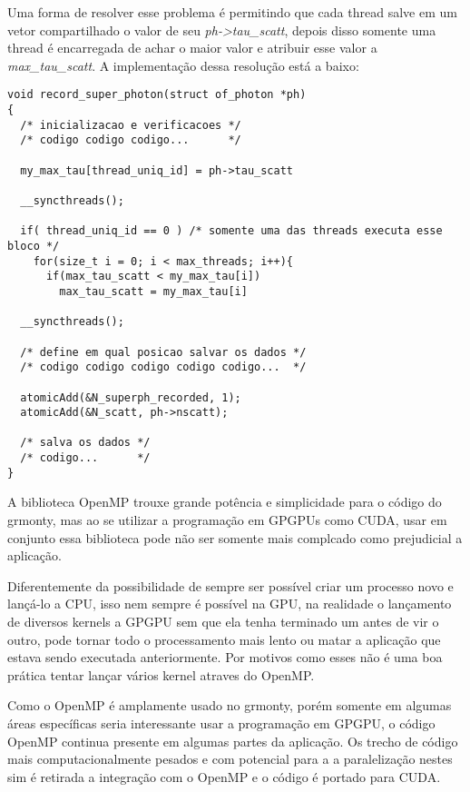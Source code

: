     Uma forma de resolver esse problema é permitindo que cada thread salve em um vetor compartilhado o valor de seu \textit{ph->tau\_scatt}, depois disso somente uma thread é encarregada de achar o maior valor e atribuir esse valor a \textit{max\_tau\_scatt}. A implementação dessa resolução está a baixo:

    \begin{lstlisting}
void record_super_photon(struct of_photon *ph)
{
  /* inicializacao e verificacoes */
  /* codigo codigo codigo...      */

  my_max_tau[thread_uniq_id] = ph->tau_scatt

  __syncthreads();

  if( thread_uniq_id == 0 ) /* somente uma das threads executa esse bloco */
    for(size_t i = 0; i < max_threads; i++){
      if(max_tau_scatt < my_max_tau[i])
        max_tau_scatt = my_max_tau[i]

  __syncthreads();

  /* define em qual posicao salvar os dados */
  /* codigo codigo codigo codigo codigo...  */

  atomicAdd(&N_superph_recorded, 1);
  atomicAdd(&N_scatt, ph->nscatt);

  /* salva os dados */
  /* codigo...      */
}
    \end{lstlisting}

    A biblioteca OpenMP trouxe grande potência e simplicidade para o código do grmonty, mas ao se utilizar a programação em GPGPUs como CUDA, usar em conjunto essa biblioteca pode não ser somente mais complcado como prejudicial a aplicação.

    Diferentemente da possibilidade de sempre ser possível criar um processo novo e lançá-lo a CPU, isso nem sempre é possível na GPU, na realidade o lançamento de diversos kernels a GPGPU sem que ela tenha terminado um antes de vir o outro, pode tornar todo o processamento mais lento ou matar a aplicação que estava sendo executada anteriormente. Por motivos como esses não é uma boa prática tentar lançar vários kernel atraves do OpenMP.

    Como o OpenMP é amplamente usado no grmonty, porém somente em algumas áreas específicas seria interessante usar a programação em GPGPU, o código OpenMP continua presente em algumas partes da aplicação. Os trecho de código mais computacionalmente pesados e com potencial para a a paralelização nestes sim é retirada a integração com o OpenMP e o código é portado para CUDA.

